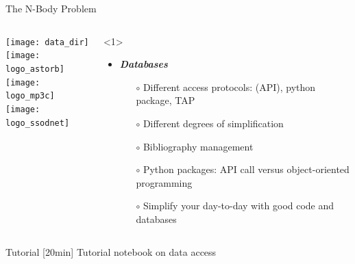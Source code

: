 \begin{frame}[t]{The N-Body Problem}

\begin{columns}[T]

      \begin{column}{.3\textwidth}
        \vspace{0.5em}\texttt{[image: data\_dir]}\\
        \vspace{0.5em}\texttt{[image: logo\_astorb]}\\
        \vspace{0.5em}\texttt{[image: logo\_mp3c]}\\
        \vspace{0.5em}\texttt{[image: logo\_ssodnet]}\\
      \end{column}


    \begin{column}{.7\textwidth}
      \begin{overlayarea}{\textwidth}{\textheight}
        \begin{onlyenv}<1>
          \vspace{1em}
          \begin{itemize}[<.->]
            \item \emph{\bf Databases}
              \begin{itemize}[<.->]
                \item[$\circ$] Different access protocols: (API), python package, TAP
                \item[$\circ$] Different degrees of simplification
                \item[$\circ$] Bibliography management
                \item[$\circ$] Python packages: API call versus object-oriented programming
                \item[$\circ$] Simplify your day-to-day with good code and databases
              \end{itemize}
          \end{itemize}
        \end{onlyenv}
      \end{overlayarea}
    \end{column}
  \end{columns}

\end{frame}

\begin{frame}[t]{Tutorial}
  [20min] Tutorial notebook on data access
\end{frame}

